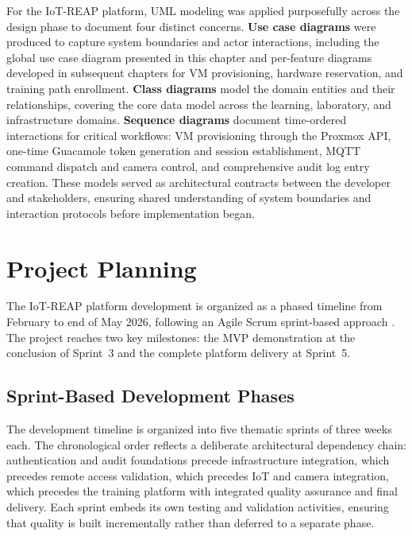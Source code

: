 For the IoT-REAP platform, UML modeling was applied purposefully across the design
phase to document four distinct concerns. \textbf{Use case diagrams} were produced to
capture system boundaries and actor interactions, including the global use case diagram
presented in this chapter and per-feature diagrams developed in subsequent chapters for
VM provisioning, hardware reservation, and training path enrollment. \textbf{Class
diagrams} model the domain entities and their relationships, covering the core data
model across the learning, laboratory, and infrastructure domains. \textbf{Sequence
diagrams} document time-ordered interactions for critical workflows: VM provisioning
through the Proxmox API, one-time Guacamole token generation and session establishment,
MQTT command dispatch and camera control, and comprehensive audit log entry
creation. These models served as architectural contracts between the developer and
stakeholders, ensuring shared understanding of system boundaries and interaction
protocols before implementation began.

\section{Project Planning}
\label{sec:project_planning}

The IoT-REAP platform development is organized as a phased timeline from February
to end of May 2026, following an Agile Scrum sprint-based approach
{\footnotesize\cite{agile}}. The project reaches two key milestones: the MVP
demonstration at the conclusion of Sprint~3 and the complete platform delivery at
Sprint~5.

\subsection{Sprint-Based Development Phases}

The development timeline is organized into five thematic sprints of three weeks each.
The chronological order reflects a deliberate architectural dependency chain:
authentication and audit foundations precede infrastructure integration, which precedes
remote access validation, which precedes IoT and camera integration, which precedes the
training platform with integrated quality assurance and final delivery. Each sprint
embeds its own testing and validation activities, ensuring that quality is built
incrementally rather than deferred to a separate phase.

